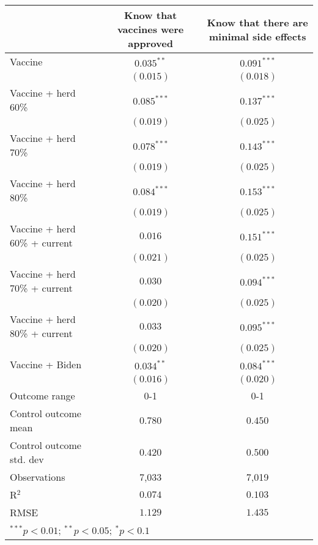 \begin{table}
\begin{center}
\begin{tabular}{l c c}
\hline
 & Know that vaccines were approved & Know that there are minimal side effects \\
\hline
Vaccine                       & $0.035^{**}$  & $0.091^{***}$ \\
                              & $(0.015)$     & $(0.018)$     \\
Vaccine + herd 60\%           & $0.085^{***}$ & $0.137^{***}$ \\
                              & $(0.019)$     & $(0.025)$     \\
Vaccine + herd 70\%           & $0.078^{***}$ & $0.143^{***}$ \\
                              & $(0.019)$     & $(0.025)$     \\
Vaccine + herd 80\%           & $0.084^{***}$ & $0.153^{***}$ \\
                              & $(0.019)$     & $(0.025)$     \\
Vaccine + herd 60\% + current & $0.016$       & $0.151^{***}$ \\
                              & $(0.021)$     & $(0.025)$     \\
Vaccine + herd 70\% + current & $0.030$       & $0.094^{***}$ \\
                              & $(0.020)$     & $(0.025)$     \\
Vaccine + herd 80\% + current & $0.033$       & $0.095^{***}$ \\
                              & $(0.020)$     & $(0.025)$     \\
Vaccine + Biden               & $0.034^{**}$  & $0.084^{***}$ \\
                              & $(0.016)$     & $(0.020)$     \\
\hline
Outcome range                 & 0-1           & 0-1           \\
Control outcome mean          & $0.780$       & $0.450$       \\
Control outcome std. dev      & $0.420$       & $0.500$       \\
Observations                  & 7,033         & 7,019         \\
R$^{2}$                       & $0.074$       & $0.103$       \\
RMSE                          & $1.129$       & $1.435$       \\
\hline
\multicolumn{3}{l}{\scriptsize{$^{***}p<0.01$; $^{**}p<0.05$; $^{*}p<0.1$}}
\end{tabular}
\caption{}
\label{table:Tables and Figures/SI_table4_manip_B}
\end{center}
\end{table}
